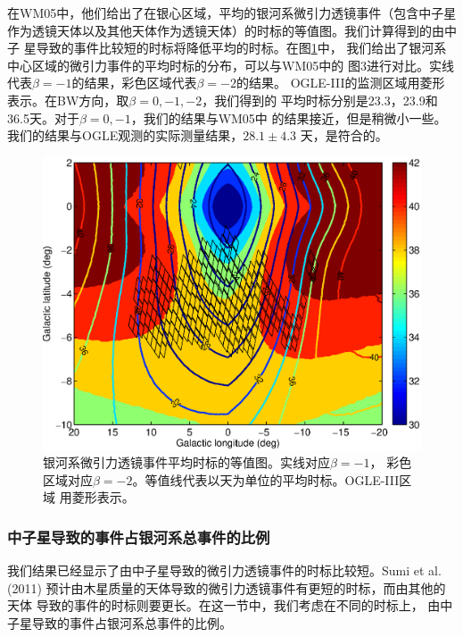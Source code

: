 在WM05中，他们给出了在银心区域，平均的银河系微引力透镜事件（包含中子星
作为透镜天体以及其他天体作为透镜天体）的时标的等值图。我们计算得到的由中子
星导致的事件比较短的时标将降低平均的时标。在图\ref{map_timescale}中，
我们给出了银河系中心区域的微引力事件的平均时标的分布，可以与WM05中的
图3进行对比。实线代表$\beta=-1$的结果，彩色区域代表$\beta=-2$的结果。
OGLE-III的监测区域用菱形表示。在BW方向，取$\beta=0,-1,-2$，我们得到的
平均时标分别是23.3，23.9和36.5天。对于$\beta=0,-1$，我们的结果与WM05中
的结果接近，但是稍微小一些。我们的结果与OGLE观测的实际测量结果，$28.1\pm4.3$
天\supercite{sumi}，是符合的。

%
\begin{figure}
\begin{center}
  \includegraphics[width=4 in,trim=0 0 0 3cm]{map_timescale.eps}
%
\caption{银河系微引力透镜事件平均时标的等值图。实线对应$\beta=-1$，
彩色区域对应$\beta=-2$。等值线代表以天为单位的平均时标。OGLE-III区域
用菱形表示。}
\label{map_timescale}
\end{center}
\end{figure}
%

\subsubsection{中子星导致的事件占银河系总事件的比例}

我们结果已经显示了由中子星导致的微引力透镜事件的时标比较短。Sumi et al. (2011)\supercite{sumi11}
预计由木星质量的天体导致的微引力透镜事件有更短的时标，而由其他的天体
导致的事件的时标则要更长。在这一节中，我们考虑在不同的时标上，
由中子星导致的事件占银河系总事件的比例。

